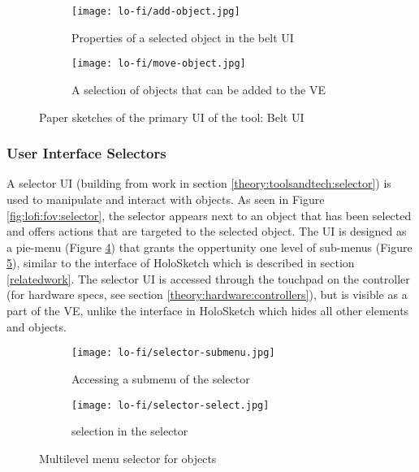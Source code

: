 
\begin{figure}
\begin{subfigure}{.5\textwidth}
  \centering
  \texttt{[image: lo-fi/add-object.jpg]}
  \caption{Properties of a selected object in the belt UI}
  \label{fig:lofi:object:add}
\end{subfigure}%
\begin{subfigure}{.5\textwidth}
  \centering
  \texttt{[image: lo-fi/move-object.jpg]}
  \caption{A selection of objects that can be added to the VE}
  \label{fig:lofi:object:move}
\end{subfigure}
\caption{Paper sketches of the primary UI of the tool: Belt UI}
\label{fig:lofi:object}
\end{figure}


\subsubsection{User Interface Selectors}
\label{result:lofi:selector}
A selector UI (building from work in section \ref{theory:toolsandtech:selector}) is used to manipulate and interact with objects. As seen in Figure \ref{fig:lofi:fov:selector}, the selector appears next to an object that has been selected and offers actions that are targeted to the selected object. The UI is designed as a pie-menu (Figure \ref{fig:lofi:selector:select}) that grants the oppertunity one level of sub-menus (Figure \ref{fig:lofi:selector:submenu}), similar to the interface of HoloSketch which is described in section \ref{relatedwork}. The selector UI is accessed through the touchpad on the controller (for hardware specs, see section \ref{theory:hardware:controllers}), but is visible as a part of the VE, unlike the interface in HoloSketch which hides all other elements and objects.


\begin{figure}
\begin{subfigure}{.5\textwidth}
  \centering
  \texttt{[image: lo-fi/selector-submenu.jpg]}
  \caption{Accessing a submenu of the selector}
  \label{fig:lofi:selector:select}
\end{subfigure}%
\begin{subfigure}{.5\textwidth}
  \centering
  \texttt{[image: lo-fi/selector-select.jpg]}
  \caption{selection in the selector}
  \label{fig:lofi:selector:submenu}
\end{subfigure}
\caption{Multilevel menu selector for objects}
\label{fig:lofi:selector}
\end{figure}

